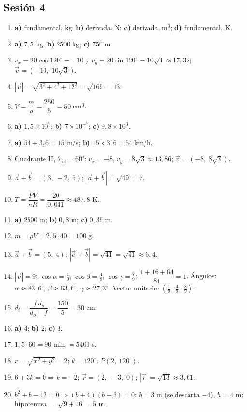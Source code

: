 \documentclass[12pt, letterpaper]{article}
\providecommand{\sen}{\sin}
\begin{document}
\subsection*{Sesión 4}
\begin{enumerate}[leftmargin=*, label=\textbf{\arabic*.}]
  \item \textbf{a)} fundamental, kg; \textbf{b)} derivada, N; \textbf{c)} derivada, m$^3$; \textbf{d)} fundamental, K.
  \item \textbf{a)} $7{,}5$ kg; \textbf{b)} $2500$ kg; \textbf{c)} $750$ m.
  \item $v_x=20\cos 120^{\circ}=-10$ y $v_y=20\sen 120^{\circ}=10\sqrt{3}\approx 17{,}32$; $\vec v=(-10,\; 10\sqrt{3})$.
  \item $|\vec v|=\sqrt{3^2+4^2+12^2}=\sqrt{169}=13$.
  \item $V=\dfrac{m}{\rho}=\dfrac{250}{5}=50$ cm$^3$.
  \item \textbf{a)} $1{,}5 \times 10^{7}$; \textbf{b)} $7 \times 10^{-7}$; \textbf{c)} $9{,}8 \times 10^{3}$.
  \item \textbf{a)} $54 \div 3{,}6 = 15$ m/s; \quad \textbf{b)} $15 \times 3{,}6 = 54$ km/h.
  \item Cuadrante II, $\theta_{\text{ref}}=60^{\circ}$: $v_x=-8$, $v_y=8\sqrt{3}\approx 13{,}86$; $\vec v=(-8,\; 8\sqrt{3})$.
  \item $\vec a+\vec b=(3,\; -2,\; 6)$; $|\vec a+\vec b|=\sqrt{49}=7$.
  \item $T=\dfrac{PV}{nR}=\dfrac{20}{0{,}041}\approx 487{,}8$ K.
  \item \textbf{a)} $2500$ m; \textbf{b)} $0{,}8$ m; \textbf{c)} $0{,}35$ m.
  \item $m=\rho V=2{,}5\cdot 40=100$ g.
  \item $\vec a+\vec b=(5,\; 4)$; $|\vec a+\vec b|=\sqrt{41}=\sqrt{41}\approx 6{,}4$.
  \item $|\vec v|=9$; $\cos\alpha=\frac{1}{9}$, $\cos\beta=\frac{4}{9}$, $\cos\gamma=\frac{8}{9}$; $\dfrac{1+16+64}{81}=1$. \checkmark\quad Ángulos: $\alpha\approx 83{,}6^{\circ}$, $\beta\approx 63{,}6^{\circ}$, $\gamma\approx 27{,}3^{\circ}$. Vector unitario: $(\frac{1}{9},\; \frac{4}{9},\; \frac{8}{9})$.
  \item $d_i=\dfrac{f\,d_o}{d_o-f}=\dfrac{150}{5}=30$ cm.
  \item \textbf{a)} 4; \quad \textbf{b)} 2; \quad \textbf{c)} 3.
  \item $1{,}5\cdot 60=90$ min $=5400$ s.
  \item $r=\sqrt{x^2+y^2}=2$; $\theta=120^{\circ}$. $P(2,\; 120^{\circ})$.
  \item $6+3k=0\Rightarrow k=-2$; $\vec r=(2,\; -3,\; 0)$; $|\vec r|=\sqrt{13}\approx 3{,}61$.
  \item $b^2+b-12=0\Rightarrow(b+4)(b-3)=0$: $b=3$ m (se descarta $-4$), $h=4$ m; hipotenusa $=\sqrt{9+16}=5$ m.
\end{enumerate}
\end{document}
